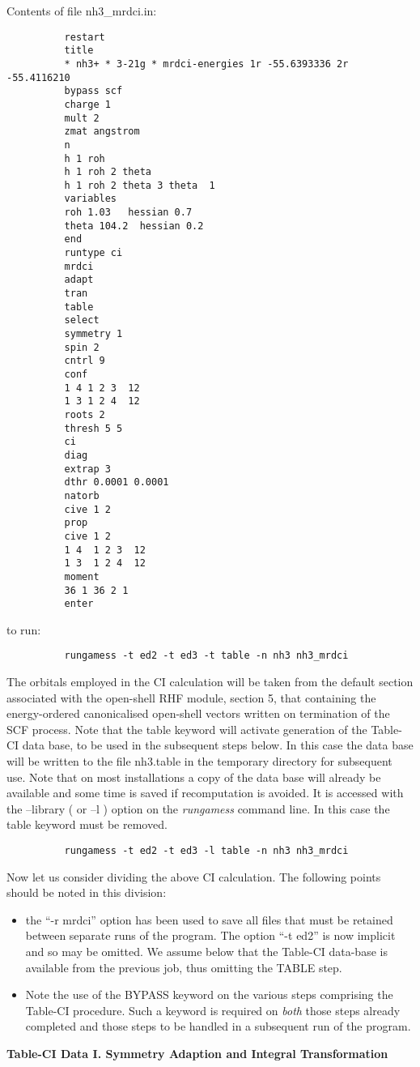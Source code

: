 \documentclass[11pt,fleqn]{article}
\begin{document}
Contents of file nh3\_mrdci.in:
{
\footnotesize
\begin{verbatim}
          restart
          title
          * nh3+ * 3-21g * mrdci-energies 1r -55.6393336 2r -55.4116210
          bypass scf
          charge 1
          mult 2
          zmat angstrom
          n
          h 1 roh
          h 1 roh 2 theta
          h 1 roh 2 theta 3 theta  1
          variables
          roh 1.03   hessian 0.7
          theta 104.2  hessian 0.2
          end
          runtype ci
          mrdci
          adapt 
          tran 
          table
          select  
          symmetry 1
          spin 2
          cntrl 9
          conf
          1 4 1 2 3  12
          1 3 1 2 4  12
          roots 2
          thresh 5 5
          ci 
          diag 
          extrap 3
          dthr 0.0001 0.0001
          natorb
          cive 1 2
          prop
          cive 1 2
          1 4  1 2 3  12
          1 3  1 2 4  12
          moment
          36 1 36 2 1
          enter
\end{verbatim}
}
to run:
{
\footnotesize
\begin{verbatim}
          rungamess -t ed2 -t ed3 -t table -n nh3 nh3_mrdci
\end{verbatim}
}

The orbitals employed in the CI calculation will be taken from the
default section associated with the open-shell RHF module, section 5,
that containing the energy-ordered canonicalised open-shell vectors
written on termination of the SCF process.
Note that the table keyword will activate generation 
of the Table-CI data base, to be used in the subsequent 
steps below. In this case  the data base will be written
to the file nh3.table in the temporary directory
for subsequent use. Note that on most installations a
copy of the data base will already be available and some time is
saved if recomputation is avoided. It is accessed with the
--library ( or --l ) option on the {\em rungamess} command line. In this
case the table keyword must be removed.

{
\footnotesize
\begin{verbatim}
          rungamess -t ed2 -t ed3 -l table -n nh3 nh3_mrdci
\end{verbatim}
}
Now let us consider dividing the above CI calculation. The following
points should be noted in this division:
\begin{itemize}
\item the ``-r mrdci'' option has been used to save all files that must
be retained between separate runs of the 
program. The option ``-t ed2'' is now implicit and so may be omitted. 
We assume below that the Table-CI data-base is available
from the previous job, thus omitting the TABLE step.
\item Note the use of the BYPASS keyword on the various steps
comprising the Table-CI procedure. Such a keyword is required
on {\em both} those steps already completed and those steps
to be handled in a subsequent run of the program.
\end{itemize}
{\bf Table-CI Data I. Symmetry Adaption and Integral Transformation}\\
\end{document}
